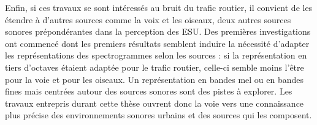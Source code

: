 Enfin, si ces travaux se sont intéressés au bruit du trafic routier, il convient de les étendre à d'autres sources comme la voix et les oiseaux, deux autres sources sonores prépondérantes dans la perception des ESU. Des premières investigations ont commencé dont les premiers résultats semblent induire la nécessité d'adapter les représentations des spectrogrammes selon les sources : si la représentation en tiers d'octaves étaient adaptée pour le trafic routier, celle-ci semble moins l'être pour la voie et pour les oiseaux. Un représentation en bandes mel ou en bandes fines mais centrées autour des sources sonores sont des pistes à explorer. Les travaux entrepris durant cette thèse ouvrent donc la voie vers une connaissance plus précise des environnements sonores urbains et des sources qui les composent.






